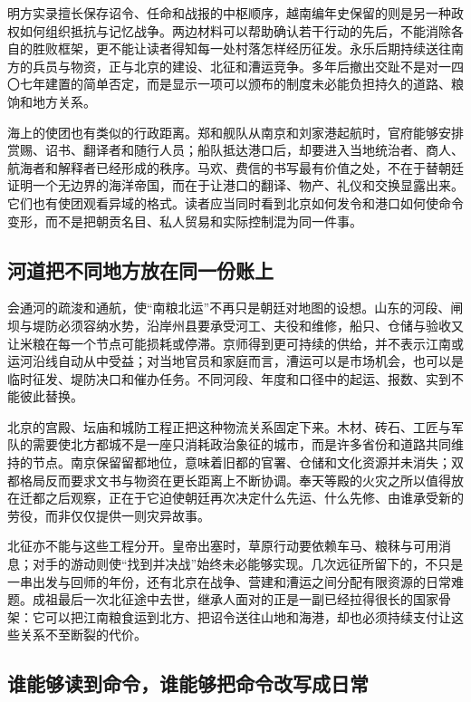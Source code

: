 明方实录擅长保存诏令、任命和战报的中枢顺序，越南编年史保留的则是另一种政权如何组织抵抗与记忆战争。两边材料可以帮助确认若干行动的先后，不能消除各自的胜败框架，更不能让读者得知每一处村落怎样经历征发。永乐后期持续送往南方的兵员与物资，正与北京的建设、北征和漕运竞争。多年后撤出交趾不是对一四〇七年建置的简单否定，而是显示一项可以颁布的制度未必能负担持久的道路、粮饷和地方关系。

海上的使团也有类似的行政距离。郑和舰队从南京和刘家港起航时，官府能够安排赏赐、诏书、翻译者和随行人员；船队抵达港口后，却要进入当地统治者、商人、航海者和解释者已经形成的秩序。马欢、费信的书写最有价值之处，不在于替朝廷证明一个无边界的海洋帝国，而在于让港口的翻译、物产、礼仪和交换显露出来。它们也有使团观看异域的格式。读者应当同时看到北京如何发令和港口如何使命令变形，而不是把朝贡名目、私人贸易和实际控制混为同一件事。

\subsection{河道把不同地方放在同一份账上}

会通河的疏浚和通航，使“南粮北运”不再只是朝廷对地图的设想。山东的河段、闸坝与堤防必须容纳水势，沿岸州县要承受河工、夫役和维修，船只、仓储与验收又让米粮在每一个节点可能损耗或停滞。京师得到更可持续的供给，并不表示江南或运河沿线自动从中受益；对当地官员和家庭而言，漕运可以是市场机会，也可以是临时征发、堤防决口和催办任务。不同河段、年度和口径中的起运、报数、实到不能彼此替换。

北京的宫殿、坛庙和城防工程正把这种物流关系固定下来。木材、砖石、工匠与军队的需要使北方都城不是一座只消耗政治象征的城市，而是许多省份和道路共同维持的节点。南京保留留都地位，意味着旧都的官署、仓储和文化资源并未消失；双都格局反而要求文书与物资在更长距离上不断协调。奉天等殿的火灾之所以值得放在迁都之后观察，正在于它迫使朝廷再次决定什么先运、什么先修、由谁承受新的劳役，而非仅仅提供一则灾异故事。

北征亦不能与这些工程分开。皇帝出塞时，草原行动要依赖车马、粮秣与可用消息；对手的游动则使“找到并决战”始终未必能够实现。几次远征所留下的，不只是一串出发与回师的年份，还有北京在战争、营建和漕运之间分配有限资源的日常难题。成祖最后一次北征途中去世，继承人面对的正是一副已经拉得很长的国家骨架：它可以把江南粮食运到北方、把诏令送往山地和海港，却也必须持续支付让这些关系不至断裂的代价。

\subsection{谁能够读到命令，谁能够把命令改写成日常}

